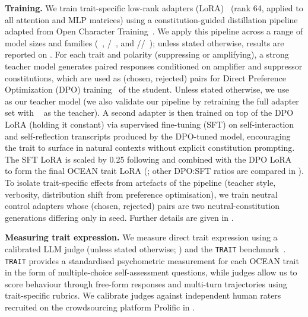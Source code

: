 \textbf{Training.} We train trait-specific low-rank adapters (LoRA)~\citep{hu2021lora} (rank 64, applied to all attention and MLP matrices) using a constitution-guided distillation pipeline adapted from Open Character Training~\citep{maiya2025opencharacter}. We apply this pipeline across a range of model sizes and families (\LlamaThreePointOneSizeEightBInstruct~\citep{grattafiori2024llama}, \QwenThreeSizeEightB/\QwenThreeSizeThirtyTwoB~\citep{qwen2025qwen3}, and \GemmaThreeSizeFourBIT/\GemmaThreeSizeTwelveBIT/\GemmaThreeSizeTwentySevenBIT~\citep{gemma_2025}); unless stated otherwise, results are reported on \LlamaThreePointOneSizeEightBInstruct. For each trait and polarity (suppressing or amplifying), a strong teacher model generates paired responses conditioned on amplifier and suppressor constitutions, which are used as (chosen, rejected) pairs for Direct Preference Optimization (DPO) training~\citep{rafailov2023direct} of the student. Unless stated otherwise, we use \GLMFourPointFiveAir~\citep{zai2025glm45} as our teacher model (we also validate our pipeline by retraining the full adapter set with \DeepSeekVThreePointTwo~\citep{deepseek2025v32} as the teacher). A second adapter is then trained on top of the DPO LoRA (holding it constant) via supervised fine-tuning (SFT) on self-interaction and self-reflection transcripts produced by the DPO-tuned model, encouraging the trait to surface in natural contexts without explicit constitution prompting. The SFT LoRA is scaled by 0.25 following \citet{maiya2025opencharacter} and combined with the DPO LoRA~\citep{wortsman2022modelsoupsaveragingweights} to form the final OCEAN trait LoRA (; other DPO:SFT ratios are compared in ). To isolate trait-specific effects from artefacts of the pipeline (teacher style, verbosity, distribution shift from preference optimisation), we train neutral control adapters whose (chosen, rejected) pairs are two neutral-constitution generations differing only in seed. Further details are given in .

\textbf{Measuring trait expression.} We measure direct trait expression using a calibrated LLM judge (\QwenThreeSizeTwoThreeFiveB unless stated otherwise; ) and the \texttt{TRAIT} benchmark~\citep{lee2024trait}. \texttt{TRAIT} provides a standardised psychometric measurement for each OCEAN trait in the form of multiple-choice self-assessment questions, while judges allow us to score behaviour through free-form responses and multi-turn trajectories using trait-specific rubrics. We calibrate judges against independent human raters recruited on the crowdsourcing platform Prolific in .

